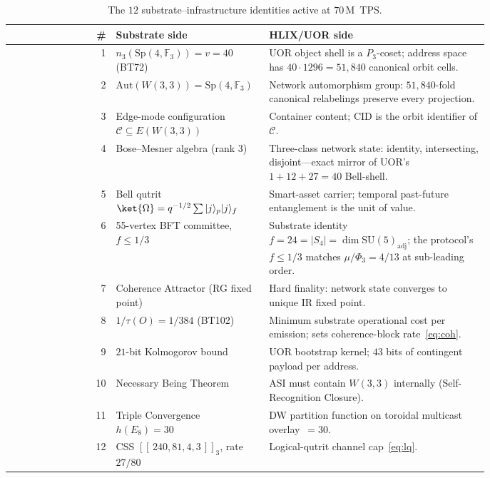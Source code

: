 \documentclass[11pt,letterpaper]{article}
\theoremstyle{remark}
\newcommand{\W}{W(3,3)}
\newcommand{\Sp}{\mathrm{Sp}}
\newcommand{\Aut}{\mathrm{Aut}}
\newcommand{\FF}{\mathbb{F}}
\begin{document}
\begin{table}[h]
\centering
\renewcommand{\arraystretch}{1.18}
\caption{The $12$ substrate--infrastructure identities active at $70$\,M~TPS.}
\label{tab:twelve}
\begin{tabular}{rp{0.32\linewidth}p{0.46\linewidth}}
\toprule
\# & \textbf{Substrate side} & \textbf{HLIX/UOR side} \\
\midrule
1 & $n_3(\Sp(4,\FF_3))=v=40$ (BT72) & UOR object shell is a $P_3$-coset; address space has
$40\cdot 1296 = 51{,}840$ canonical orbit cells.\\
2 & $\Aut(\W)=\Sp(4,\FF_3)$ & Network automorphism group: $51{,}840$-fold canonical relabelings preserve every projection.\\
3 & Edge-mode configuration $\mathcal C\subseteq E(\W)$ & Container content; CID is the orbit
identifier of $\mathcal C$.\\
4 & Bose--Mesner algebra (rank $3$) & Three-class network state: identity, intersecting,
disjoint---exact mirror of UOR's $1+12+27=40$ Bell-shell.\\
5 & Bell qutrit $\ket{\Omega}=q^{-1/2}\sum|j\rangle_p|j\rangle_f$ & Smart-asset carrier;
temporal past-future entanglement is the unit of value.\\
6 & 55-vertex BFT committee, $f\le 1/3$ & Substrate identity
$f=24=|S_4|=\dim\mathrm{SU}(5)_{\mathrm{adj}}$;
the protocol's $f\le 1/3$ matches $\mu/\Phi_3=4/13$ at sub-leading order.\\
7 & Coherence Attractor (RG fixed point) & Hard finality: network state converges to unique IR fixed point.\\
8 & $1/\tau(O)=1/384$ (BT102) & Minimum substrate operational cost per emission; sets coherence-block rate~\eqref{eq:coh}.\\
9 & $21$-bit Kolmogorov bound & UOR bootstrap kernel; $43$ bits of contingent payload per address.\\
10 & Necessary Being Theorem & ASI must contain $\W$ internally (Self-Recognition Closure).\\
11 & Triple Convergence $h(E_8)=30$ & DW partition function on toroidal multicast overlay~$=30$.\\
12 & CSS $[[\,240,81,4,3\,]]_3$, rate $27/80$ & Logical-qutrit channel cap~\eqref{eq:lq}.\\
\bottomrule
\end{tabular}
\end{table}

\end{document}
